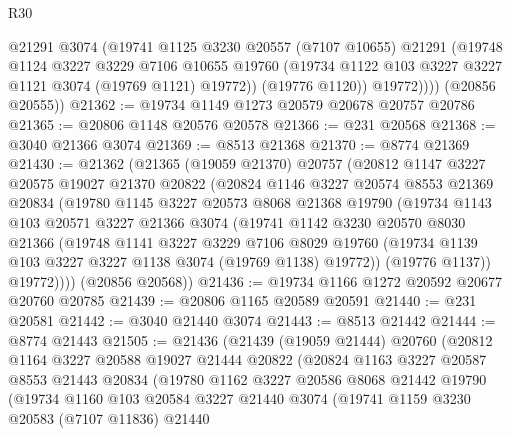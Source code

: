 \begin{lexlean}{R30}
\begin{coremodule}
              @21291
              @3074
              (@19741
                @1125
                @3230
                @20557
                (@7107 @10655)
                @21291
                (@19748
                  @1124
                  @3227
                  @3229
                  @7106
                  @10655
                  @19760
                  (@19734 @1122 @103 @3227 @3227 @1121 @3074 (@19769 @1121) @19772))
                (@19776 @1120))
              @19772))))
      (@20856 @20555))
@21362 := @19734 @1149 @1273 @20579 @20678 @20757 @20786
@21365 := @20806 @1148 @20576 @20578
@21366 := @231 @20568
@21368 := @3040 @21366 @3074
@21369 := @8513 @21368
@21370 := @8774 @21369
@21430 := @21362
    (@21365
      (@19059 @21370)
      @20757
      (@20812
        @1147
        @3227
        @20575
        @19027
        @21370
        @20822
        (@20824
          @1146
          @3227
          @20574
          @8553
          @21369
          @20834
          (@19780
            @1145
            @3227
            @20573
            @8068
            @21368
            @19790
            (@19734
              @1143
              @103
              @20571
              @3227
              @21366
              @3074
              (@19741
                @1142
                @3230
                @20570
                @8030
                @21366
                (@19748
                  @1141
                  @3227
                  @3229
                  @7106
                  @8029
                  @19760
                  (@19734 @1139 @103 @3227 @3227 @1138 @3074 (@19769 @1138) @19772))
                (@19776 @1137))
              @19772))))
      (@20856 @20568))
@21436 := @19734 @1166 @1272 @20592 @20677 @20760 @20785
@21439 := @20806 @1165 @20589 @20591
@21440 := @231 @20581
@21442 := @3040 @21440 @3074
@21443 := @8513 @21442
@21444 := @8774 @21443
@21505 := @21436
    (@21439
      (@19059 @21444)
      @20760
      (@20812
        @1164
        @3227
        @20588
        @19027
        @21444
        @20822
        (@20824
          @1163
          @3227
          @20587
          @8553
          @21443
          @20834
          (@19780
            @1162
            @3227
            @20586
            @8068
            @21442
            @19790
            (@19734
              @1160
              @103
              @20584
              @3227
              @21440
              @3074
              (@19741
                @1159
                @3230
                @20583
                (@7107 @11836)
                @21440

\end{coremodule}
\end{lexlean}
